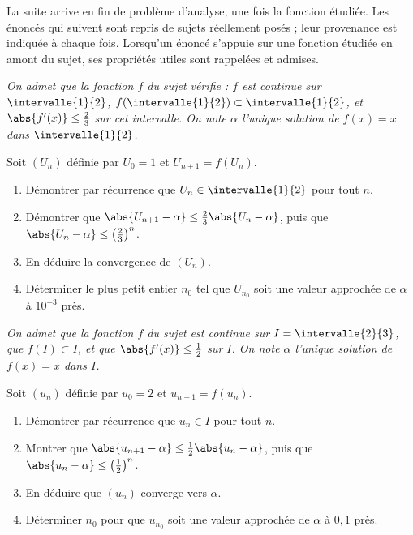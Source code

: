 \begin{annales}
La suite arrive en fin de problème d'analyse, une fois la fonction étudiée.
Les énoncés qui suivent sont repris de sujets réellement posés ; leur
provenance est indiquée à chaque fois. Lorsqu'un énoncé s'appuie sur une
fonction étudiée en amont du sujet, ses propriétés utiles sont rappelées et
admises.

\emph{On admet que la fonction $f$ du sujet vérifie : $f$ est continue sur
$\intervalle{1}{2}$, $f\!\left(\intervalle{1}{2}\right) \subset
\intervalle{1}{2}$, et $\abs{f'(x)} \leq \frac23$ sur cet intervalle. On note
$\alpha$ l'unique solution de $f(x) = x$ dans $\intervalle{1}{2}$.}

Soit $(U_{n})$ définie par $U_{0} = 1$ et $U_{n+1} = f(U_{n})$.
\begin{enumerate}[label=\textbf{\alph*)}, leftmargin=*, itemsep=0.15em]
  \item Démontrer par récurrence que $U_{n} \in \intervalle{1}{2}$ pour tout
        $n$.
  \item Démontrer que $\abs{U_{n+1}-\alpha} \leq \frac23\abs{U_{n}-\alpha}$,
        puis que $\abs{U_{n}-\alpha} \leq \left(\frac23\right)^{n}$.
  \item En déduire la convergence de $(U_{n})$.
  \item Déterminer le plus petit entier $n_{0}$ tel que $U_{n_{0}}$ soit une
        valeur approchée de $\alpha$ à $10^{-3}$ près.
\end{enumerate}

\emph{On admet que la fonction $f$ du sujet est continue sur
$I = \intervalle{2}{3}$, que $f(I) \subset I$, et que
$\abs{f'(x)} \leq \frac12$ sur $I$. On note $\alpha$ l'unique solution de
$f(x) = x$ dans $I$.}

Soit $(u_{n})$ définie par $u_{0} = 2$ et $u_{n+1} = f(u_{n})$.
\begin{enumerate}[label=\textbf{\alph*)}, leftmargin=*, itemsep=0.15em]
  \item Démontrer par récurrence que $u_{n} \in I$ pour tout $n$.
  \item Montrer que $\abs{u_{n+1}-\alpha} \leq \frac12\abs{u_{n}-\alpha}$,
        puis que $\abs{u_{n}-\alpha} \leq \left(\frac12\right)^{n}$.
  \item En déduire que $(u_{n})$ converge vers $\alpha$.
  \item Déterminer $n_{0}$ pour que $u_{n_{0}}$ soit une valeur approchée de
        $\alpha$ à $0{,}1$ près.
\end{enumerate}


\end{annales}
